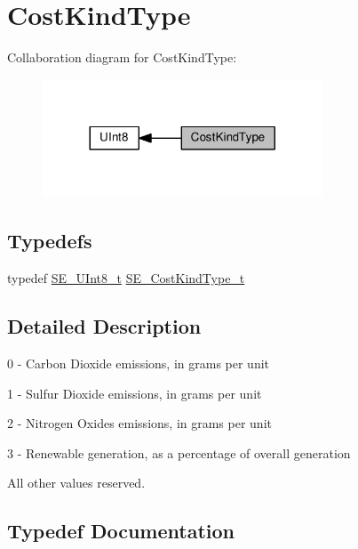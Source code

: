 \hypertarget{group__CostKindType}{}\section{Cost\+Kind\+Type}
\label{group__CostKindType}
Collaboration diagram for Cost\+Kind\+Type\+:\nopagebreak
\begin{figure}[H]
\begin{center}
\leavevmode
\includegraphics[width=236pt]{group__CostKindType}
\end{center}
\end{figure}
\subsection*{Typedefs}
\begin{DoxyCompactItemize}
\item 
typedef \hyperlink{group__UInt8_gaf7c365a1acfe204e3a67c16ed44572f5}{S\+E\+\_\+\+U\+Int8\+\_\+t} \hyperlink{group__CostKindType_ga7a0a832ce8a138d7ba008379e83b718b}{S\+E\+\_\+\+Cost\+Kind\+Type\+\_\+t}
\end{DoxyCompactItemize}


\subsection{Detailed Description}
0 -\/ Carbon Dioxide emissions, in grams per unit

1 -\/ Sulfur Dioxide emissions, in grams per unit

2 -\/ Nitrogen Oxides emissions, in grams per unit

3 -\/ Renewable generation, as a percentage of overall generation

All other values reserved. 

\subsection{Typedef Documentation}
\mbox{\label{group__CostKindType_ga7a0a832ce8a138d7ba008379e83b718b}} 
